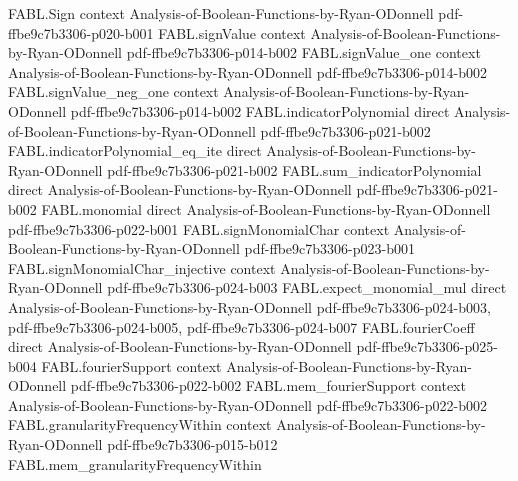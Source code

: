 \begin{theorem}
\label{FABL.coordinateExpectation_eq_fourier_sum}
\leanok
{}
\proofstep
  {FABL.Sign}
  {context}
  {Analysis-of-Boolean-Functions-by-Ryan-ODonnell}
  {pdf-ffbe9c7b3306-p020-b001}
\proofstep
  {FABL.signValue}
  {context}
  {Analysis-of-Boolean-Functions-by-Ryan-ODonnell}
  {pdf-ffbe9c7b3306-p014-b002}
\proofstep
  {FABL.signValue_one}
  {context}
  {Analysis-of-Boolean-Functions-by-Ryan-ODonnell}
  {pdf-ffbe9c7b3306-p014-b002}
\proofstep
  {FABL.signValue_neg_one}
  {context}
  {Analysis-of-Boolean-Functions-by-Ryan-ODonnell}
  {pdf-ffbe9c7b3306-p014-b002}
\proofstep
  {FABL.indicatorPolynomial}
  {direct}
  {Analysis-of-Boolean-Functions-by-Ryan-ODonnell}
  {pdf-ffbe9c7b3306-p021-b002}
\proofstep
  {FABL.indicatorPolynomial_eq_ite}
  {direct}
  {Analysis-of-Boolean-Functions-by-Ryan-ODonnell}
  {pdf-ffbe9c7b3306-p021-b002}
\proofstep
  {FABL.sum_indicatorPolynomial}
  {direct}
  {Analysis-of-Boolean-Functions-by-Ryan-ODonnell}
  {pdf-ffbe9c7b3306-p021-b002}
\proofstep
  {FABL.monomial}
  {direct}
  {Analysis-of-Boolean-Functions-by-Ryan-ODonnell}
  {pdf-ffbe9c7b3306-p022-b001}
\proofstep
  {FABL.signMonomialChar}
  {context}
  {Analysis-of-Boolean-Functions-by-Ryan-ODonnell}
  {pdf-ffbe9c7b3306-p023-b001}
\proofstep
  {FABL.signMonomialChar_injective}
  {context}
  {Analysis-of-Boolean-Functions-by-Ryan-ODonnell}
  {pdf-ffbe9c7b3306-p024-b003}
\proofstep
  {FABL.expect_monomial_mul}
  {direct}
  {Analysis-of-Boolean-Functions-by-Ryan-ODonnell}
  {pdf-ffbe9c7b3306-p024-b003,
    pdf-ffbe9c7b3306-p024-b005,
    pdf-ffbe9c7b3306-p024-b007}
\proofstep
  {FABL.fourierCoeff}
  {direct}
  {Analysis-of-Boolean-Functions-by-Ryan-ODonnell}
  {pdf-ffbe9c7b3306-p025-b004}
\proofstep
  {FABL.fourierSupport}
  {context}
  {Analysis-of-Boolean-Functions-by-Ryan-ODonnell}
  {pdf-ffbe9c7b3306-p022-b002}
\proofstep
  {FABL.mem_fourierSupport}
  {context}
  {Analysis-of-Boolean-Functions-by-Ryan-ODonnell}
  {pdf-ffbe9c7b3306-p022-b002}
\proofstep
  {FABL.granularityFrequencyWithin}
  {context}
  {Analysis-of-Boolean-Functions-by-Ryan-ODonnell}
  {pdf-ffbe9c7b3306-p015-b012}
\proofstep
  {FABL.mem_granularityFrequencyWithin}

\end{theorem}
